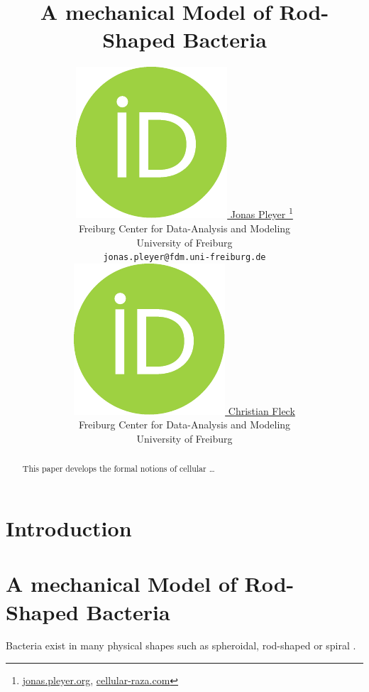 \documentclass{article}
\title{
    A mechanical Model of Rod-Shaped Bacteria
}
\author{
    \href{https://orcid.org/0009-0001-0613-7978}{
        \includegraphics[scale=0.06]{orcid.pdf}
        \hspace{1mm}Jonas Pleyer
    }
    \thanks{
        \href{https://jonas.pleyer.org}{jonas.pleyer.org},
        \href{https://cellular-raza.com}{cellular-raza.com}
    }\\
	Freiburg Center for Data-Analysis and Modeling\\
	University of Freiburg\\
	\texttt{jonas.pleyer@fdm.uni-freiburg.de} \\
	\And
	\href{https://orcid.org/0000-0002-6371-4495}{
        \includegraphics[scale=0.06]{orcid.pdf}
        \hspace{1mm}Christian Fleck
    }\\
	Freiburg Center for Data-Analysis and Modeling\\
	University of Freiburg
}
\begin{document}
\maketitle

\begin{abstract}
    This paper develops the formal notions of cellular \dots
\end{abstract}


\section{Introduction}
\label{section:introduction}

\section{A mechanical Model of Rod-Shaped Bacteria}
\label{section:mechanical-model-rod-shaped-bacteria}

Bacteria exist in many physical shapes such as spheroidal, rod-shaped or spiral
\cite{Zapun2008,Young2006}.
\end{document}

